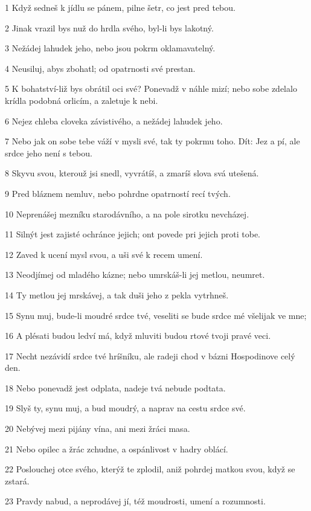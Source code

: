 \par 1 Když sedneš k jídlu se pánem, pilne šetr, co jest pred tebou.
\par 2 Jinak vrazil bys nuž do hrdla svého, byl-li bys lakotný.
\par 3 Nežádej lahudek jeho, nebo jsou pokrm oklamavatelný.
\par 4 Neusiluj, abys zbohatl; od opatrnosti své prestan.
\par 5 K bohatství-liž bys obrátil oci své? Ponevadž v náhle mizí; nebo sobe zdelalo krídla podobná orlicím, a zaletuje k nebi.
\par 6 Nejez chleba cloveka závistivého, a nežádej lahudek jeho.
\par 7 Nebo jak on sobe tebe váží v mysli své, tak ty pokrmu toho. Dít: Jez a pí, ale srdce jeho není s tebou.
\par 8 Skyvu svou, kterouž jsi snedl, vyvrátíš, a zmaríš slova svá utešená.
\par 9 Pred bláznem nemluv, nebo pohrdne opatrností recí tvých.
\par 10 Neprenášej mezníku starodávního, a na pole sirotku nevcházej.
\par 11 Silnýt jest zajisté ochránce jejich; ont povede pri jejich proti tobe.
\par 12 Zaved k ucení mysl svou, a uši své k recem umení.
\par 13 Neodjímej od mladého kázne; nebo umrskáš-li jej metlou, neumret.
\par 14 Ty metlou jej mrskávej, a tak duši jeho z pekla vytrhneš.
\par 15 Synu muj, bude-li moudré srdce tvé, veseliti se bude srdce mé všelijak ve mne;
\par 16 A plésati budou ledví má, když mluviti budou rtové tvoji pravé veci.
\par 17 Necht nezávidí srdce tvé hríšníku, ale radeji chod v bázni Hospodinove celý den.
\par 18 Nebo ponevadž jest odplata, nadeje tvá nebude podtata.
\par 19 Slyš ty, synu muj, a bud moudrý, a naprav na cestu srdce své.
\par 20 Nebývej mezi pijány vína, ani mezi žráci masa.
\par 21 Nebo opilec a žrác zchudne, a ospánlivost v hadry oblácí.
\par 22 Poslouchej otce svého, kterýž te zplodil, aniž pohrdej matkou svou, když se zstará.
\par 23 Pravdy nabud, a neprodávej jí, též moudrosti, umení a rozumnosti.
